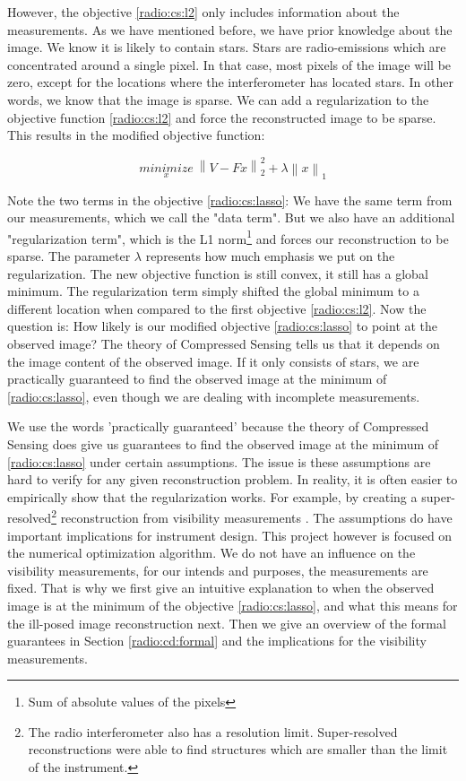 However, the objective \eqref{radio:cs:l2} only includes information about the measurements. As we have mentioned before, we have prior knowledge about the image. We know it is likely to contain stars. Stars are radio-emissions which are concentrated around a single pixel. In that case, most pixels of the image will be zero, except for the locations where the interferometer has located stars. In other words, we know that the image is sparse. We can add a regularization to the objective function \eqref{radio:cs:l2} and force the reconstructed image to be sparse. This results in the modified objective function:

\begin{equation}\label{radio:cs:lasso}
\underset{x}{minimize} \: \left \| V - Fx \right \|_2^2 + \lambda \left \| x \right \|_1
\end{equation}

Note the two terms in the objective \eqref{radio:cs:lasso}: We have the same term from our measurements, which we call the "data term". But we also have an additional "regularization term", which is the L1 norm\footnote{Sum of absolute values of the pixels} and forces our reconstruction to be sparse. The parameter $\lambda$ represents how much emphasis we put on the regularization. The new objective function is still convex, it still has a global minimum. The regularization term simply shifted the global minimum to a different location when compared to the first objective \eqref{radio:cs:l2}. Now the question is: How likely is our modified objective \eqref{radio:cs:lasso} to point at the observed image? The theory of Compressed Sensing tells us that it depends on the image content of the observed image. If it only consists of stars, we are practically guaranteed to find the observed image at the minimum of \eqref{radio:cs:lasso}, even though we are dealing with incomplete measurements.

We use the words 'practically guaranteed' because the theory of Compressed Sensing does give us guarantees to find the observed image at the minimum of \eqref{radio:cs:lasso} under certain assumptions. The issue is these assumptions are hard to verify for any given reconstruction problem. In reality, it is often easier to empirically show that the regularization works. For example, by creating a super-resolved\footnote{The radio interferometer also has a resolution limit. Super-resolved reconstructions were able to find structures which are smaller than the limit of the instrument.} reconstruction from visibility measurements \cite{dabbech2018cygnus}. The assumptions do have important implications for instrument design. This project however is focused on the numerical optimization algorithm. We do not have an influence on the visibility measurements, for our intends and purposes, the measurements are fixed. That is why we first give an intuitive explanation to when the observed image is at the minimum of the objective \eqref{radio:cs:lasso}, and what this means for the ill-posed image reconstruction next. Then we give an overview of the formal guarantees in Section \ref{radio:cd:formal} and the implications for the visibility measurements.


